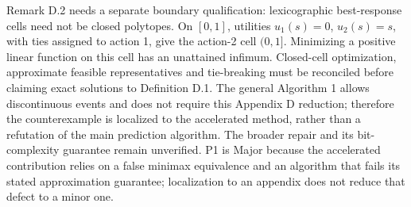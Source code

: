 \documentclass[10pt]{article}
\begin{document}
Remark D.2 needs a separate boundary qualification: lexicographic best-response cells need not be closed polytopes. On \([0,1]\), utilities \(u_1(s)=0\), \(u_2(s)=s\), with ties assigned to action 1, give the action-2 cell \((0,1]\). Minimizing a positive linear function on this cell has an unattained infimum. Closed-cell optimization, approximate feasible representatives and tie-breaking must be reconciled before claiming exact solutions to Definition D.1. The general Algorithm 1 allows discontinuous events and does not require this Appendix D reduction; therefore the counterexample is localized to the accelerated method, rather than a refutation of the main prediction algorithm. The broader repair and its bit-complexity guarantee remain unverified. P1 is Major because the accelerated contribution relies on a false minimax equivalence and an algorithm that fails its stated approximation guarantee; localization to an appendix does not reduce that defect to a minor one.\par
\end{document}
